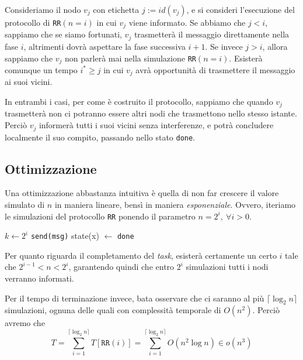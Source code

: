 Consideriamo il nodo $v_j$ con etichetta $j := id(v_j)$, e si consideri l'esecuzione del protocollo di \texttt{RR}$(n = i)$ in cui $v_j$ viene informato. Se abbiamo che $j < i$, sappiamo che se siamo fortunati, $v_j$ trasmetterà il messaggio direttamente nella fase $i$, altrimenti dovrà aspettare la fase successiva $i + 1$. Se invece $j > i$, allora sappiamo che $v_j$ non parlerà mai nella simulazione \texttt{RR}$(n = i)$. Esisterà comunque un tempo $i^* \geq j$ in cui $v_j$ avrà opportunità di trasmettere il messaggio ai suoi vicini.

In entrambi i casi, per come è costruito il protocollo, sappiamo che quando $v_j$ trasmetterà non ci potranno essere altri nodi che trasmettono nello stesso istante. Perciò $v_j$ informerà tutti i suoi vicini senza interferenze, e potrà concludere localmente il suo compito, passando nello stato \texttt{done}.

\subsection{Ottimizzazione}

Una ottimizzazione abbastanza intuitiva è quella di non far crescere il valore simulato di $n$ in maniera lineare, bensì in maniera \textit{esponenziale}. Ovvero, iteriamo le simulazioni del protocollo \texttt{RR} ponendo il parametro $n = 2^i,\ \forall i > 0$.

\begin{algorithm}
\caption{Optimized Generalized Round-Robin Protocol}
\begin{algorithmic}[1]
    \State $k \gets 2^i$
                \State \texttt{send(msg)}
                \State state(x) $\gets$ \texttt{done}
            \EndIf
        \EndFor
    \EndFor
\EndFor
\end{algorithmic}
\end{algorithm}

Per quanto riguarda il completamento del \textit{task}, esisterà certamente un certo $i$ tale che $2^{i-1} < n < 2^i$, garantendo quindi che entro $2^i$ simulazioni tutti i nodi verranno informati.

Per il tempo di terminazione invece, bata osservare che ci saranno al più $\lceil \log_2 n \rceil$ simulazioni, ognuna delle quali con complessità temporale di $O(n^2)$. Perciò avremo che
\[
    T = \sum_{i=1}^{\lceil \log_2 n \rceil}T[\texttt{RR}(i)] = \sum_{i = 1}^{\lceil \log_2 n \rceil} O(n^2 \log n) \in o(n^3)
\]

